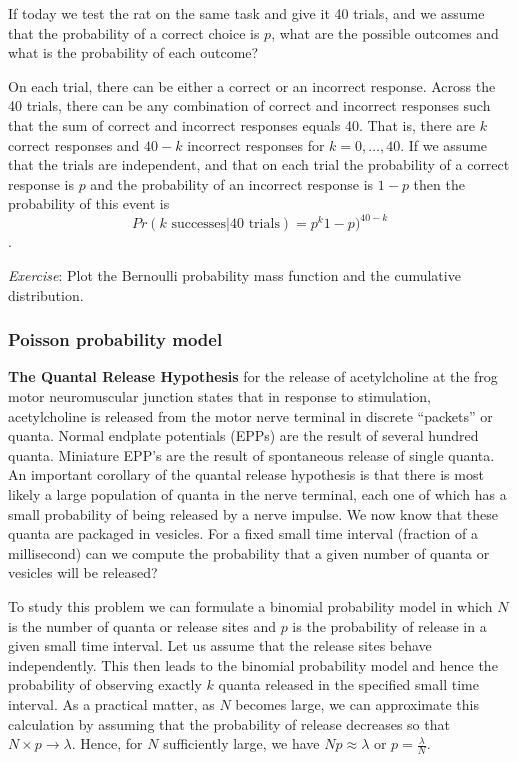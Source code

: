 \documentclass[
]{article}
\begin{document}
If today we test the rat on the same task and give it 40 trials, and we
assume that the probability of a correct choice is \(p\), what are the
possible outcomes and what is the probability of each outcome?

On each trial, there can be either a correct or an incorrect response.
Across the 40 trials, there can be any combination of correct and
incorrect responses such that the sum of correct and incorrect responses
equals 40. That is, there are \(k\) correct responses and \(40 - k\)
incorrect responses for \(k = 0,\ldots, 40\). If we assume that the
trials are independent, and that on each trial the probability of a
correct response is \(p\) and the probability of an incorrect response
is \(1-p\) then the probability of this event is
\[Pr(k \mbox{ successes}|40 \mbox{ trials}) = p^k 1-p)^{40-k}\].

\emph{Exercise}: Plot the Bernoulli probability mass function and the
cumulative distribution.

\hypertarget{poisson-probability-model}{%
\subsubsection{Poisson probability
model}\label{poisson-probability-model}}

\textbf{The Quantal Release Hypothesis} for the release of acetylcholine
at the frog motor neuromuscular junction states that in response to
stimulation, acetylcholine is released from the motor nerve terminal in
discrete ``packets'' or quanta. Normal endplate potentials (EPPs) are
the result of several hundred quanta. Miniature EPP's are the result of
spontaneous release of single quanta. An important corollary of the
quantal release hypothesis is that there is most likely a large
population of quanta in the nerve terminal, each one of which has a
small probability of being released by a nerve impulse. We now know that
these quanta are packaged in vesicles. For a fixed small time interval
(fraction of a millisecond) can we compute the probability that a given
number of quanta or vesicles will be released?

To study this problem we can formulate a binomial probability model in
which \(N\) is the number of quanta or release sites and \(p\) is the
probability of release in a given small time interval. Let us assume
that the release sites behave independently. This then leads to the
binomial probability model and hence the probability of observing
exactly \(k\) quanta released in the specified small time interval. As a
practical matter, as \(N\) becomes large, we can approximate this
calculation by assuming that the probability of release decreases so
that \(N \times p \to \lambda\). Hence, for \(N\) sufficiently large, we
have \(Np \approx \lambda\) or \(p = \frac{\lambda}{N}\).
\end{document}

